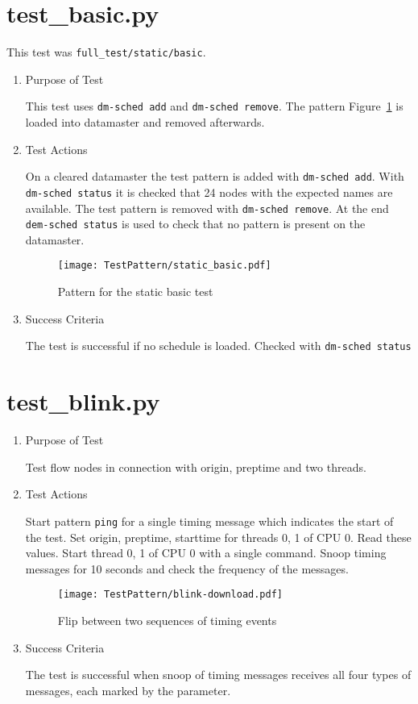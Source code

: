 \documentclass[12pt,a4paper]{report}
\begin{document}
\section{test\_basic.py}
This test was \texttt{full\_test/static/basic}.
\begin{enumerate}
  \item Purpose of Test

  This test uses \texttt{dm-sched add} and \texttt{dm-sched remove}. The pattern Figure~\ref{fig:Pattern_for_the_static_basic_test}
  is loaded into datamaster and removed afterwards.

  \item Test Actions

  On a cleared datamaster the test pattern is added with \texttt{dm-sched add}. With \texttt{dm-sched status} it is checked
  that 24 nodes with the expected names are available. The test pattern is removed with \texttt{dm-sched remove}. At the
  end \texttt{dem-sched status} is used to check that no pattern is present on the datamaster.

    \begin{figure}
        \centering
        \texttt{[image: TestPattern/static\_basic.pdf]}
        \caption{Pattern for the static basic test}
        \label{fig:Pattern_for_the_static_basic_test}
    \end{figure}
  \item Success Criteria

  The test is successful if no schedule is loaded. Checked with \texttt{dm-sched status}
\end{enumerate}

\section{test\_blink.py}
\begin{enumerate}
  \item Purpose of Test

  Test flow nodes in connection with origin, preptime and two threads.
  \item Test Actions

  Start pattern \texttt{ping} for a single timing message which indicates the start of the test.
  Set origin, preptime, starttime for threads 0, 1 of CPU 0. Read these values. Start thread 0, 1 of CPU 0
  with a single command. Snoop timing messages for 10 seconds and check the frequency of the messages.
    \begin{figure}
        \centering
        \texttt{[image: TestPattern/blink-download.pdf]}
        \caption{Flip between two sequences of timing events}
        \label{fig:blink}
    \end{figure}
  \item Success Criteria

  The test is successful when snoop of timing messages receives all four types of messages, each marked by the parameter.
\end{enumerate}
\end{document}
